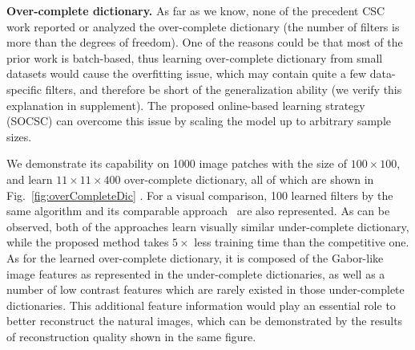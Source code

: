 {\bfseries Over-complete dictionary.} As far as we know, none of the precedent CSC work reported or analyzed the over-complete dictionary (the number of filters is more than the degrees of freedom). One of the reasons could be that most of the prior work is batch-based, thus learning over-complete dictionary from small datasets would cause the overfitting issue, which may contain quite a few data-specific filters, and therefore be short of the generalization ability (we verify this explanation in supplement). The proposed online-based learning strategy (SOCSC) can overcome this issue by scaling the model up to arbitrary sample sizes.

We demonstrate its capability on 1000 image patches with the size of $100 \times 100$, and learn $11 \times 11 \times 400$ over-complete dictionary, all of which are shown in Fig.\ \ref{fig:overCompleteDic} . For a visual comparison, 100 learned filters by the same algorithm and its comparable approach~\cite{liu-2018-first} are also represented. As can be observed, both of the approaches learn visually similar under-complete dictionary, while the proposed method takes $5 \times$ less training time than the competitive one. As for the learned over-complete dictionary, it is composed of the Gabor-like image features as represented in the under-complete dictionaries, as well as a number of low contrast features which are rarely existed in those under-complete dictionaries. This additional feature information would play an essential role to better reconstruct the natural images, which can be demonstrated by the results of reconstruction quality shown in the same figure.

